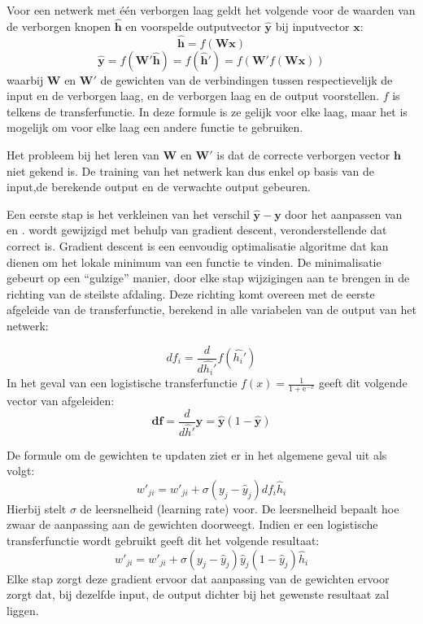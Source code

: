 Voor een netwerk met \'e\'en verborgen laag geldt het volgende voor de waarden van de verborgen knopen $\mathbf{\hat{h}}$ en voorspelde outputvector $\mathbf{\hat{y}}$ bij inputvector $\mathbf{x}$:
\begin{equation}
    \mathbf{\hat{h}} = f(\mathbf{Wx})
\end{equation}
\begin{equation}
    \boldsymbol{\hat{y}} = f(\boldsymbol{W'\hat{h}}) = f(\boldsymbol{\hat{h}'}) = f(\boldsymbol{W'}f(\boldsymbol{Wx}))
\end{equation}
waarbij $\mathbf{W}$ en $\mathbf{W'}$ de gewichten van de verbindingen tussen respectievelijk de input en de verborgen laag, en de verborgen laag en de output voorstellen. $f$ is telkens de transferfunctie. In deze formule is ze gelijk voor elke laag, maar het is mogelijk om voor elke laag een andere functie te gebruiken.

Het probleem bij het leren van $\mathbf{W}$ en $\mathbf{W'}$ is dat de correcte verborgen vector $\mathbf{h}$ niet gekend is. De training van het netwerk kan dus enkel op basis van de input,de  berekende output en de verwachte output gebeuren.

Een eerste stap is het verkleinen van het verschil $\mathbf{\hat{y}} - \mathbf{y}$ door het aanpassen van  en .  wordt gewijzigd met behulp van gradient descent, veronderstellende dat  correct is. Gradient descent is een eenvoudig optimalisatie algoritme dat kan dienen om het lokale minimum van een functie te vinden. De minimalisatie gebeurt op een ``gulzige'' manier, door elke stap wijzigingen aan te brengen in de richting van de steilste afdaling. Deze richting komt overeen met de eerste afgeleide van de transferfunctie, berekend in alle variabelen van de output van het netwerk: 

\begin{equation}
df_i = \frac{d}{d\hat{h_i}'}f(\hat{h_i}')
\end{equation}
In het geval van een logistische transferfunctie $f(x) = \frac{1}{1 + \mathrm e^{-x}}$ geeft dit volgende vector van afgeleiden:
\begin{equation}
  \mathbf{df} = \frac{d}{d\hat{h}'}\mathbf{\hat{y}} = \mathbf{\hat{y}}(1-\mathbf{\hat{y}})
\end{equation}

De formule om de gewichten te updaten ziet er in het algemene geval uit als volgt:
\begin{equation}
  w'_{ji} = w'_{ji} + \sigma(y_j-\hat{y}_j)df_i\hat{h}_i
\end{equation}
Hierbij stelt $\sigma$ de leersnelheid (learning rate) voor. De leersnelheid bepaalt hoe zwaar de aanpassing aan de gewichten doorweegt.
Indien er een logistische transferfunctie wordt gebruikt geeft dit het volgende resultaat:
\begin{equation}
    w'_{ji} = w'_{ji} + \sigma(y_j-\hat{y}_j)\hat{y}_j(1-\hat{y}_j)\hat{h}_i
\end{equation}
Elke stap zorgt deze gradient ervoor dat aanpassing van de gewichten ervoor zorgt dat, bij dezelfde input, de output dichter bij het gewenste resultaat zal liggen.

